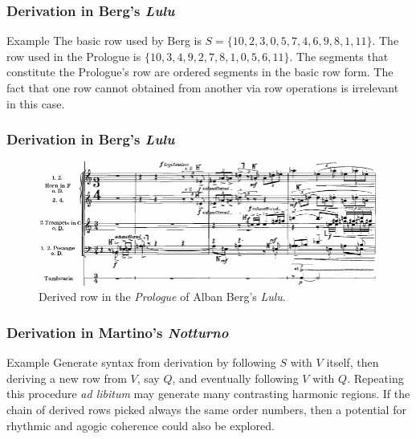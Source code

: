 \begin{frame}
	\frametitle{Derivation in Berg's \emph{Lulu}}
	\begin{block}{Example}
		The basic row used by Berg is $S = \{ 10, 2, 3, 0, 5, 7, 4, 6, 9, 8, 1, 11 \}$. The row used in the Prologue is $\{ 10, 3, 4, 9, 2, 7, 8, 1, 0, 5, 6, 11 \}$. The segments that constitute the Prologue's row are ordered segments in the basic row form. The fact that one row cannot obtained from another via row operations is irrelevant in this case.
	\end{block}
\end{frame}

\begin{frame}
	\frametitle{Derivation in Berg's \emph{Lulu}}
	\begin{figure}[htbp]
    	\centering
		\includegraphics[width=\textwidth]{figures/berg2.png}
		\caption{Derived row in the \emph{Prologue} of Alban Berg's \emph{Lulu}.}
	\end{figure}
\end{frame}

\begin{frame}
	\frametitle{Derivation in Martino's \emph{Notturno}}
	\begin{block}{Example}
		Generate syntax from derivation by following $S$ with $V$ itself, then deriving a new row from $V$, say $Q$, and eventually following $V$ with $Q$. Repeating this procedure \emph{ad libitum} may generate many contrasting harmonic regions. If the chain of derived rows picked always the same order numbers, then a potential for rhythmic and agogic coherence could also be explored.
	\end{block}
\end{frame}
